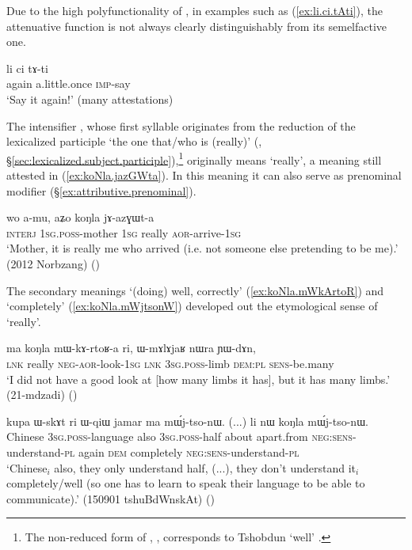  Due to the high polyfunctionality of , in examples such as  (\ref{ex:li.ci.tAti}), the attenuative function is not always clearly distinguishably from its semelfactive one. 
 
 \begin{exe}
\ex \label{ex:li.ci.tAti}
\gll li ci tɤ-ti \\
again a.little.once \textsc{imp}-say \\
\glt `Say it again!' (many attestations)
 \end{exe} 
  
The intensifier , whose first syllable originates from the reduction of the lexicalized participle  `the one that/who is (really)' (, §\ref{sec:lexicalized.subject.participle}),\footnote{The non-reduced form of , , corresponds to Tshobdun  `well' \citep[55]{jackson19tshobdun}. } originally means `really', a meaning still attested in (\ref{ex:koNla.jazGWta}). In this meaning it can also serve as prenominal modifier (§\ref{ex:attributive.prenominal}).

 \begin{exe}
\ex \label{ex:koNla.jazGWta}
\gll   wo a-mu, aʑo koŋla jɤ-azɣɯt-a \\
\textsc{interj} \textsc{1sg}.\textsc{poss}-mother \textsc{1sg} really \textsc{aor}-arrive-\textsc{1sg} \\
\glt `Mother, it is really me who arrived (i.e. not someone else pretending to be me).' (2012 Norbzang)
()
 \end{exe} 
 
The secondary meanings `(doing) well, correctly' (\ref{ex:koNla.mWkArtoR}) and `completely' (\ref {ex:koNla.mWjtsonW})  developed out the etymological sense of `really'.
 
 \begin{exe}
\ex \label{ex:koNla.mWkArtoR}
\gll ma koŋla mɯ-kɤ-rtoʁ-a ri, ɯ-mɤlɤjaʁ nɯra ɲɯ-dɤn, \\
\textsc{lnk} really \textsc{neg}-\textsc{aor}-look-\textsc{1sg} \textsc{lnk} \textsc{3sg}.\textsc{poss}-limb \textsc{dem}:\textsc{pl} \textsc{sens}-be.many \\
\glt `I did not have a good look at [how many limbs it has], but it has many limbs.' (21-mdzadi)
()
 \end{exe} 
 
 
\begin{exe}
\ex \label{ex:koNla.mWjtsonW}
\gll kupa ɯ-skɤt ri ɯ-qiɯ jamar ma mɯ́j-tso-nɯ. (...) li nɯ koŋla mɯ́j-tso-nɯ. \\
Chinese \textsc{3sg}.\textsc{poss}-language also \textsc{3sg}.\textsc{poss}-half about apart.from \textsc{neg}:\textsc{sens}-understand-\textsc{pl} {  } again \textsc{dem} completely \textsc{neg}:\textsc{sens}-understand-\textsc{pl} \\
\glt `Chinese$_i$  also, they only understand half, (...), they don't understand it$_i$ completely/well (so one has to learn to speak their language to be able to communicate).' (150901 tshuBdWnskAt)
()
\end{exe} 

